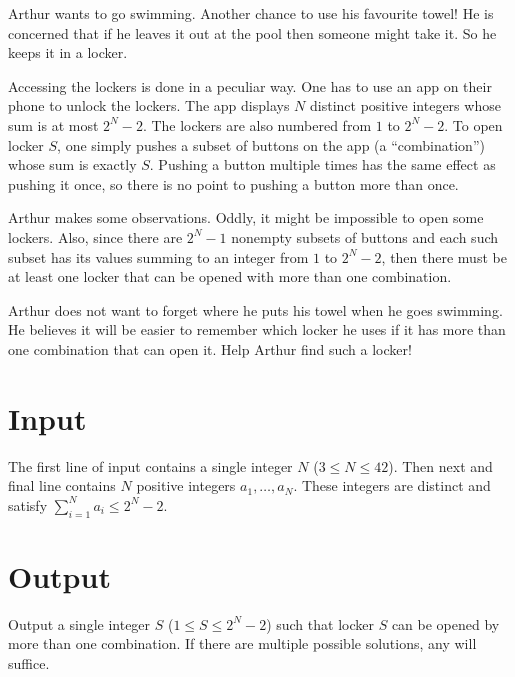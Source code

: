 
Arthur wants to go swimming. Another chance to use his favourite towel! He is concerned that if he leaves it out at the pool then someone might take it. So he keeps it in a locker.

Accessing the lockers is done in a peculiar way. One has to use an app on their phone to unlock the lockers. The app displays $N$ distinct positive integers whose sum is at most $2^N-2$. The lockers are also numbered from $1$ to $2^N-2$. To open locker $S$, one simply pushes a subset of buttons on the app (a ``combination'') whose sum is exactly $S$. Pushing a button multiple times has the same effect as pushing it once, so there is no point to pushing a button more than once.

Arthur makes some observations. Oddly, it might be impossible to open some lockers. Also, since there are $2^N-1$ nonempty subsets of buttons and each such subset has its values summing to an integer from $1$ to $2^N-2$, then there must be at least one locker that can be opened with more than one combination.

Arthur does not want to forget where he puts his towel when he goes swimming. He believes it will be easier to remember which locker he uses if it has more than one combination that can open it. Help Arthur find such a locker!

\section*{Input}

The first line of input contains a single integer $N$ ($3 \leq N \leq 42$). Then next and final line contains $N$ positive integers $a_1, \ldots, a_N$. These integers are distinct and satisfy $\sum_{i=1}^N a_i \leq 2^N-2$.

\section*{Output}
Output a single integer $S$ ($1 \leq S \leq 2^N-2$) such that locker $S$ can be opened by more than one combination. If there are multiple possible solutions, any will suffice.
